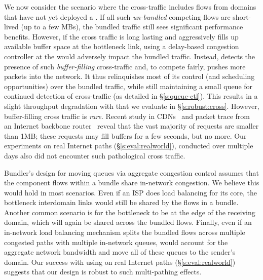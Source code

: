  We now consider the scenario where the cross-traffic includes flows from domains that have not yet deployed a \name. If all such \emph{un-bundled} competing flows are short-lived (up to a few MBs), the bundled traffic still sees significant performance benefits. 
However, if the cross traffic is long lasting and aggressively fills up available buffer space at the bottleneck link, using a delay-based congestion controller  at the \name would adversely impact the bundled traffic. 
Instead, \name detects the presence of such \emph{buffer-filling} cross-traffic and, to compete fairly, pushes more packets into the network. 
It thus relinquishes most of its control (and scheduling opportunities) over the bundled traffic, while still maintaining a small queue for continued detection of cross-traffic (as detailed in \S\ref{s:queue-ctl}). This results in a slight throughput degradation with \name that we evaluate in \S\ref{s:robust:cross}.
However, buffer-filling cross traffic is \emph{rare}.
Recent study in CDNs~\cite{akamai-cdn-trace} and packet trace from an Internet backbone router~\cite{caida-dataset} reveal that the vast majority of requests are smaller than 1MB; these requests may fill buffers for a few seconds, but no more. Our experiments on real Internet paths (\S\ref{s:eval:realworld}), conducted over multiple days also did not encounter such pathological cross traffic. 

 Bundler’s design for moving queues via aggregate congestion control assumes that the component flows within a bundle share in-network congestion. We believe this would hold in most scenarios. Even if an ISP does load balancing for its core, the bottleneck interdomain links would still be shared by the flows in a bundle. Another common scenario is for the bottleneck to be at the edge of the receiving domain, which will again be shared across the bundled flows. Finally, even if an in-network load balancing mechanism splits the bundled flows across multiple congested paths with multiple in-network queues, \name would account for the aggregate network bandwidth and move all of these queues to the sender's domain. Our success with using \name on real Internet paths (\S\ref{s:eval:realworld}) suggests that our design is robust to such multi-pathing effects. 

